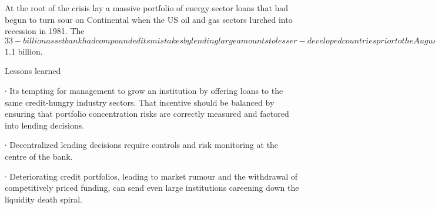 At the root of the crisis lay a massive portfolio of energy sector loans that had begun to turn sour on Continental when the US oil and gas sectors lurched into recession in 1981. The $33-billion asset bank had compounded its mistakes by lending large amounts to lesser-developed countries prior to the August 1982 start of the major LDC crisis of the 1980s.

Rumours / Loss of Public Confidence

With investors and creditors spooked by rumours that the bank might fail or be taken over, Continental was quickly shut out of its usual domestic and international wholesale funding markets. The sharp drop in confidence can lead counterparties in the wholesale markets to suddenly withdraw funding from a damaged bank, spinning the institution into a funding liquidity crisis.

Emergency Funding and Guarantee – “Too Big To Fail”

By May 17, regulatory agencies and the banking industry had arranged billions of dollars in emergency funding for the stricken giant. The Federal Deposit Insurance Corporation tried to stem the bleeding away of the banks funds by extending a guarantee to uninsured depositors and creditors at the bank giving credibility to the notion that some banks should be considered too big to fail.

The emergency help was followed by a package of permanent measures, making Continental the largest bank in the history of US banking ever to be rescued by government agencies.

The FDICs share of the bill was later calculated to be $1.1 billion.
 

 
 






Lessons learned

∙        Its tempting for management to grow an institution by offering loans to the same credit-hungry industry sectors. That incentive should be balanced by ensuring that portfolio concentration risks are correctly measured and factored into lending decisions.

∙        Decentralized lending decisions require controls and risk monitoring at the centre of the bank.

∙        Deteriorating credit portfolios, leading to market rumour and the withdrawal of competitively priced funding, can send even large institutions careening down the liquidity death spiral.

